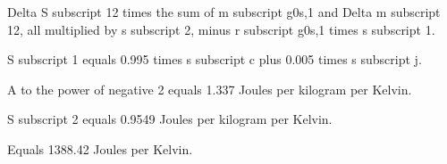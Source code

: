 Delta S subscript 12 times the sum of m subscript g0s,1 and Delta m subscript 12, all multiplied by s subscript 2, minus r subscript g0s,1 times s subscript 1.

S subscript 1 equals 0.995 times s subscript c plus 0.005 times s subscript j.

A to the power of negative 2 equals 1.337 Joules per kilogram per Kelvin.

S subscript 2 equals 0.9549 Joules per kilogram per Kelvin.

Equals 1388.42 Joules per Kelvin.